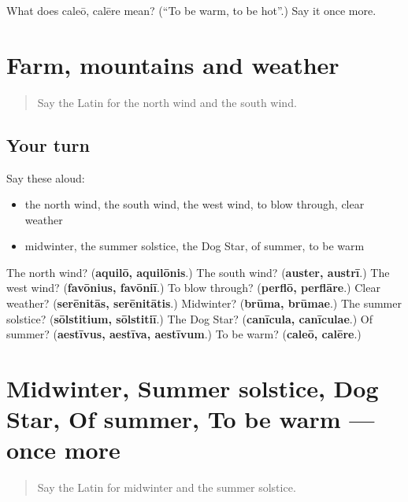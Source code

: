 \begin{tcolorbox}[breakable,colback=teal!4,colframe=teal!35!black,title={Before you move on}]
What does caleō, calēre mean? (\textquotedblleft{}To be warm, to be hot\textquotedblright{}.) Say it once more.
\end{tcolorbox}
\section[(dialogue)]{Farm, mountains and weather}

\label{lesson:LA-R488-review-487-488}



\begin{quote}
Say the Latin for the north wind and the south wind.
\end{quote}

\subsection*{Your turn}
Say these aloud:

\begin{itemize}
\raggedright
  \item the north wind, the south wind, the west wind, to blow through, clear weather
  \item midwinter, the summer solstice, the Dog Star, of summer, to be warm
\end{itemize}

\begin{tcolorbox}[breakable,colback=teal!4,colframe=teal!35!black,title={Before you move on}]
The north wind? (\textbf{aquilō, aquilōnis}.) The south wind? (\textbf{auster, austrī}.) The west wind? (\textbf{favōnius, favōniī}.) To blow through? (\textbf{perflō, perflāre}.) Clear weather? (\textbf{serēnitās, serēnitātis}.) Midwinter? (\textbf{brūma, brūmae}.) The summer solstice? (\textbf{sōlstitium, sōlstitiī}.) The Dog Star? (\textbf{canīcula, canīculae}.) Of summer? (\textbf{aestīvus, aestīva, aestīvum}.) To be warm? (\textbf{caleō, calēre}.)
\end{tcolorbox}
\section[(dialogue)]{Midwinter, Summer solstice, Dog Star, Of summer, To be warm — once more}

\label{lesson:LA-R488-review-final-488}



\begin{quote}
Say the Latin for midwinter and the summer solstice.
\end{quote}

